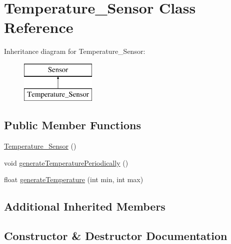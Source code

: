 \hypertarget{class_temperature___sensor}{}\section{Temperature\+\_\+\+Sensor Class Reference}
\label{class_temperature___sensor}
Inheritance diagram for Temperature\+\_\+\+Sensor\+:\begin{figure}[H]
\begin{center}
\leavevmode
\includegraphics[height=2.000000cm]{class_temperature___sensor}
\end{center}
\end{figure}
\subsection*{Public Member Functions}
\begin{DoxyCompactItemize}
\item 
\mbox{\hyperlink{class_temperature___sensor_ab0f4f8edbe06c0829adf2913363c8ec6}{Temperature\+\_\+\+Sensor}} ()
\item 
void \mbox{\hyperlink{class_temperature___sensor_a14de6b8ba681b5720ff26113f99d8e45}{generate\+Temperature\+Periodically}} ()
\item 
float \mbox{\hyperlink{class_temperature___sensor_a6e12d531cd569ffcfa0a7ed0b2aeb6d0}{generate\+Temperature}} (int min, int max)
\end{DoxyCompactItemize}
\subsection*{Additional Inherited Members}


\subsection{Constructor \& Destructor Documentation}
\mbox{\label{class_temperature___sensor_ab0f4f8edbe06c0829adf2913363c8ec6}} 
